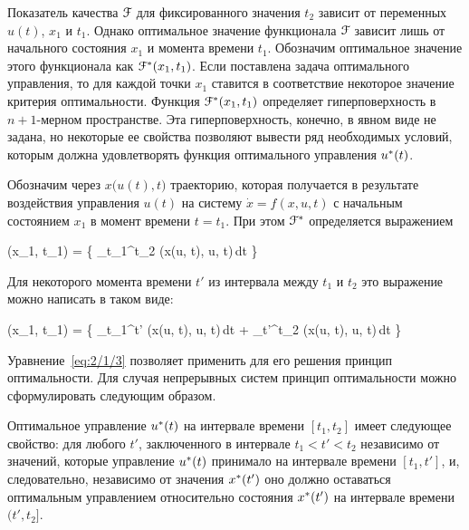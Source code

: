 Показатель качества $\mathcal{F}$ для фиксированного значения $t_2$ зависит от переменных $u(t)$, $x_1$ и $t_1$. Однако оптимальное значение функционала $\mathcal{F}$ зависит лишь от начального состояния $x_1$ и момента времени $t_1$. Обозначим оптимальное значение этого функционала как $\mathcal{F}^{*}(x_1, t_1)$. Если поставлена задача оптимального управления, то для каждой точки $x_1$ ставится в соответствие некоторое значение критерия оптимальности. Функция $\mathcal{F}^{*}(x_1, t_1)$ определяет гиперповерхность в $n+1$-мерном пространстве. Эта гиперповерхность, конечно, в явном виде не задана, но некоторые ее свойства позволяют вывести ряд необходимых условий, которым должна удовлетворять функция оптимального управления $u^{*}(t)$.

Обозначим через $x \bigl( u(t), t \bigr)$ траекторию, которая получается в результате воздействия управления $u(t)$ на систему $\dot{x} = f(x, u, t)$ с начальным состоянием $x_1$ в момент времени $t = t_1$. При этом $\mathcal{F}^{*}$ определяется выражением

    \optF(x_1, t_1) =  \biggl\{ \int\limits_{t_1}^{t_2} \funcL\bigl(x(u, t), u, t\bigr)\,dt \biggr\} 
\eeq

Для некоторого момента времени $t'$ из интервала между $t_1$ и $t_2$ это выражение можно написать в таком виде:

    \optF(x_1, t_1) =  \biggl\{ \int\limits_{t_1}^{t'} \funcL\bigl(x(u, t), u, t\bigr)\,dt + \int\limits_{t'}^{t_2} \funcL\bigl(x(u, t), u, t\bigr)\,dt \biggr\} 
\eeq

Уравнение~\ref{eq:2/1/3} позволяет применить для его решения принцип оптимальности. Для случая непрерывных систем принцип оптимальности можно сформулировать следующим образом.

\begin{statement}
	Оптимальное управление $u^{*}(t)$ на интервале времени $[t_1, t_2]$ имеет следующее свойство: для любого $t'$, заключенного в интервале $t_1 < t' < t_2$ независимо от значений, которые управление $u^{*}(t)$ принимало на интервале времени $[t_1, t']$, и, следовательно, независимо от значения $x^{*}(t')$ оно должно оставаться оптимальным управлением относительно состояния $x^{*}(t')$ на интервале времени $(t', t_2]$.
\end{statement}

